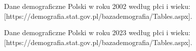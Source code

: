\documentclass{article}
\begin{document}
	\begin{thebibliography}{9}
		Dane demograficzne Polski w roku 2002 według płci i wieku: [https://demografia.stat.gov.pl/bazademografia/Tables.aspx].
		
		Dane demograficzne Polski w roku 2023 według płci i wieku: [https://demografia.stat.gov.pl/bazademografia/Tables.aspx].
	\end{thebibliography}
	
\end{document}
